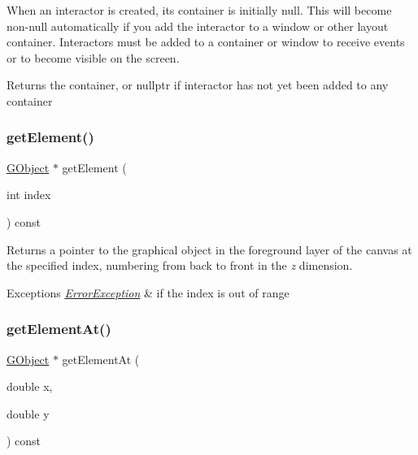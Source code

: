When an interactor is created, its container is initially null. This will become non-\/null automatically if you add the interactor to a window or other layout container. Interactors must be added to a container or window to receive events or to become visible on the screen. \begin{DoxyReturn}{Returns}
the container, or nullptr if interactor has not yet been added to any container 
\end{DoxyReturn}
\mbox{\label{classGCanvas_abde388cc529d22bb5f7f4a54d56049d8}} 
\subsubsection{\texorpdfstring{get\+Element()}{getElement()}}
{\footnotesize\ttfamily \mbox{\hyperlink{classGObject}{G\+Object}} $\ast$ get\+Element (\begin{DoxyParamCaption}\item[{int}]{index }\end{DoxyParamCaption}) const\hspace{0.3cm}{\ttfamily [virtual]}}



Returns a pointer to the graphical object in the foreground layer of the canvas at the specified index, numbering from back to front in the {\itshape z} dimension. 


\begin{DoxyExceptions}{Exceptions}
{\em \mbox{\hyperlink{classErrorException}{Error\+Exception}}} & if the index is out of range \\
\hline
\end{DoxyExceptions}
\mbox{\label{classGCanvas_a25efa999eca5790ec26ef091b05f961c}} 
\subsubsection{\texorpdfstring{get\+Element\+At()}{getElementAt()}}
{\footnotesize\ttfamily \mbox{\hyperlink{classGObject}{G\+Object}} $\ast$ get\+Element\+At (\begin{DoxyParamCaption}\item[{double}]{x,  }\item[{double}]{y }\end{DoxyParamCaption}) const\hspace{0.3cm}{\ttfamily [virtual]}}



